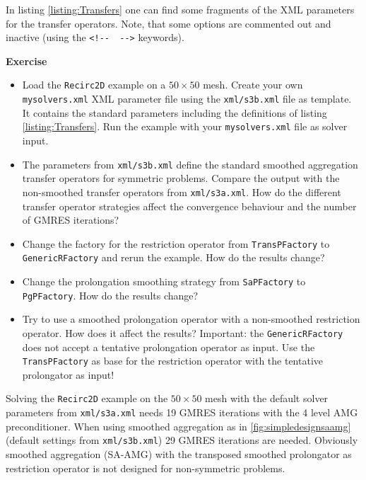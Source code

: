\documentclass[12pt,a4paper]{article}
\begin{document}
In listing \ref{listing:Transfers} one can find some fragments of the XML parameters for the transfer operators. Note, that some options are commented out and inactive (using the \verb|<!--  -->| keywords).

\begin{graybox}
 \textbf{Exercise}
 \begin{itemize}
  \item Load the \verb|Recirc2D| example on a $50\times 50$ mesh. Create your own \verb|mysolvers.xml| XML parameter file using the \verb|xml/s3b.xml| file as template. It contains the standard parameters including the definitions of listing \ref{listing:Transfers}. Run the example with your \verb|mysolvers.xml| file as solver input.
  \item The parameters from \verb|xml/s3b.xml| define the standard smoothed aggregation transfer operators for symmetric problems. Compare the output with the non-smoothed transfer operators from \verb|xml/s3a.xml|. How do the different transfer operator strategies affect the convergence behaviour and the number of GMRES iterations?
  \item Change the factory for the restriction operator from \verb|TransPFactory| to \verb|GenericRFactory| and rerun the example. How do the results change?
  \item Change the prolongation smoothing strategy from \verb|SaPFactory| to \verb|PgPFactory|. How do the results change?
  \item Try to use a smoothed prolongation operator with a non-smoothed restriction operator. How does it affect the results? Important: the \verb|GenericRFactory| does not accept a tentative prolongation operator as input. Use the \verb|TransPFactory| as base for the restriction operator with the tentative prolongator as input!
 \end{itemize}
\end{graybox}

Solving the \texttt{Recirc2D} example on the $50\times 50$ mesh with the default solver parameters from \verb|xml/s3a.xml| needs 19 GMRES iterations with the 4 level AMG preconditioner. When using smoothed aggregation as in \ref{fig:simpledesignsaamg} (default settings from \verb|xml/s3b.xml|) 29 GMRES iterations are needed. Obviously smoothed aggregation (SA-AMG) with the transposed smoothed prolongator as restriction operator is not designed for non-symmetric problems. 
\end{document}

